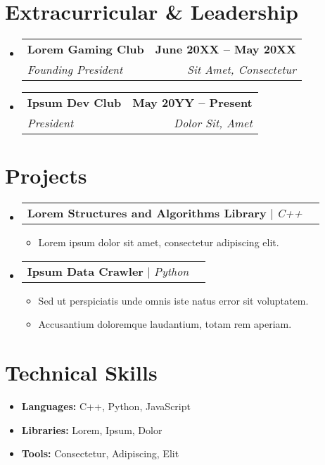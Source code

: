 \documentclass[letterpaper,11pt]{article}
\makeatletter
\newcommand{\resumeItem}[1]{
  \item\small{ {#1 \vspace{-2pt}} }
}
\newcommand{\resumeSubheading}[4]{
  \vspace{-2pt}\item
    \begin{tabular*}{1.0\textwidth}[t]{l@{\extracolsep{\fill}}r}
      \textbf{#1} & \textbf{\small #2} \\
      \textit{\small #3} & \textit{\small #4} \\
    \end{tabular*}\vspace{-7pt}
}
\newcommand{\resumeProjectHeading}[2]{
    \item
    \begin{tabular*}{1.0\textwidth}{l@{\extracolsep{\fill}}r}
      \small #1 & \textbf{\small #2} \\
    \end{tabular*}\vspace{-7pt}
}
\newcommand{\resumeSubHeadingListStart}{\begin{itemize}[leftmargin=0in, label={}]}
\newcommand{\resumeSubHeadingListEnd}{\end{itemize}}
\newcommand{\resumeItemListStart}{\begin{itemize}}
\newcommand{\resumeItemListEnd}{\end{itemize}\vspace{-5pt}}
\makeatother
\begin{document}
\section{Extracurricular \& Leadership}
\resumeSubHeadingListStart
    \resumeSubheading
      {Lorem Gaming Club}{June 20XX -- May 20XX}
      {Founding President}{Sit Amet, Consectetur}
    \resumeSubheading
      {Ipsum Dev Club}{May 20YY -- Present}
      {President}{Dolor Sit, Amet}
\resumeSubHeadingListEnd

\section{Projects}
\resumeSubHeadingListStart
    \resumeProjectHeading
      {\textbf{Lorem Structures and Algorithms Library} $|$ \emph{C++}}{}
      \resumeItemListStart
          \resumeItem{Lorem ipsum dolor sit amet, consectetur adipiscing elit.}
      \resumeItemListEnd
    \resumeProjectHeading
      {\textbf{Ipsum Data Crawler} $|$ \emph{Python}}{}
      \resumeItemListStart
          \resumeItem{Sed ut perspiciatis unde omnis iste natus error sit voluptatem.}
          \resumeItem{Accusantium doloremque laudantium, totam rem aperiam.}
      \resumeItemListEnd
\resumeSubHeadingListEnd

\section{Technical Skills}
\resumeSubHeadingListStart
    \resumeItem{ \textbf{Languages:} C++, Python, JavaScript }
    \resumeItem{ \textbf{Libraries:} Lorem, Ipsum, Dolor }
    \resumeItem{ \textbf{Tools:} Consectetur, Adipiscing, Elit }
\resumeSubHeadingListEnd
\end{document}
